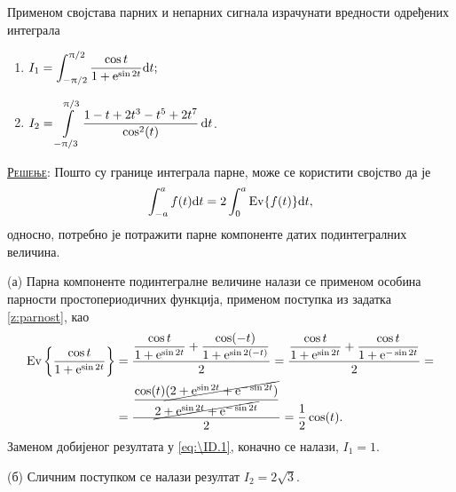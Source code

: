 \PID 
Применом својстава парних и непарних 
сигнала
израчунати вредности 
одређених интеграла 
\begin{multicols}{2}
\begin{enumerate}[label=(\alph*)]
\item
$\displaystyle 
I_1 = 
\int_{-\uppi/2}^{\uppi/2}
\dfrac{\cos t}{1 + {\rm e}^{\sin 2t}}
 {\rm d} t;
$

\item
$\displaystyle
I_2 = \int\limits_{-\uppi/3}^{\uppi/3}
\dfrac{1 - t + 2t^3 - t^5 + 2t^7}{\cos^2 (t)}\,{\rm d} t$.
\end{enumerate}
\end{multicols}

\textsc{\underline{Решење}}:
Пошто су границе интеграла парне, може се користити својство да је 
\begin{equation}
\displaystyle \int_{-a}^{a} f(t) \de t = 2\int_{0}^{a} {\rm Ev}\{f(t)\} \de t, \label{eq:\ID.1}
\end{equation}
односно, потребно је потражити парне компоненте датих подинтегралних величина. 

(а) Парна компоненте подинтегралне величине налази се применом особина парности простопериодичних функција, 
применом поступка из задатка \ref{z:parnost}, као 
\begin{eqnarray}
    {\rm Ev}\left\{  
        \dfrac{\cos t}{1 + {\rm e}^{\sin 2t}}
    \right\}
    &= \dfrac{
        \dfrac{\cos t}{1 + {\rm e}^{\sin 2t}} + \dfrac{\cos (-t)}{1 + {\rm e}^{\sin 2(-t)}}
    }{2}
    =
    \dfrac{
        \dfrac{\cos t}{1 + {\rm e}^{\sin 2t}} + \dfrac{\cos t}{1 + {\rm e}^{-\sin 2t}}
    }{2}
    =  \\
    &= \dfrac{ \dfrac{\cos(t) \cancel{( 2 + {\rm e}^{\sin 2t} + {\rm e}^{-\sin 2t} )} } { \cancel{2 + {\rm e}^{\sin 2t} + {\rm e}^{-\sin 2t}} } }{2}
    = \dfrac{1}{2} \cos(t).
\end{eqnarray}
Заменом добијеног резултата у \eqref{eq:\ID.1}, коначно се налази, $I_1 = 1$.

(б) Сличним поступком се налази резултат $I_2 = 2\sqrt 3$.
